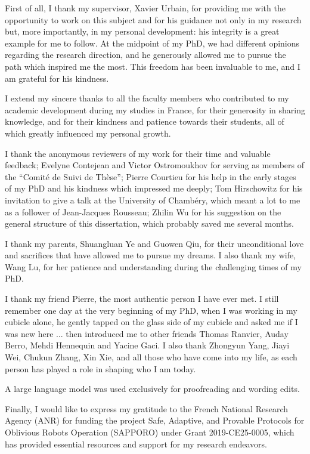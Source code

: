 

First of all, I thank my supervisor, Xavier Urbain, for providing me with the opportunity to work on this subject and for his guidance not only in my research but, more importantly, in my personal development: his integrity is a great example for me to follow. At the midpoint of my PhD, we had different opinions regarding the research direction, and he generously allowed me to pursue the path which inspired me the most. This freedom has been invaluable to me, and I am grateful for his kindness.

I extend my sincere thanks to all the faculty members who contributed to my academic development during my studies in France, for their generosity in sharing knowledge, and for their kindness and patience towards their students, all of which greatly influenced my personal growth.

I thank the anonymous reviewers of my work for their time and valuable feedback; Evelyne Contejean and Victor Ostromoukhov for serving as members of the \enquote{Comité de Suivi de Thèse}; Pierre Courtieu for his help in the early stages of my PhD and his kindness which impressed me deeply; Tom Hirschowitz for his invitation to give a talk at the University of Chambéry, which meant a lot to me as a follower of Jean-Jacques Rousseau; Zhilin Wu for his suggestion on the general structure of this dissertation, which probably saved me several months.

I thank my parents, Shuangluan Ye and Guowen Qiu, for their unconditional love and sacrifices that have allowed me to pursue my dreams. I also thank my wife, Wang Lu, for her patience and understanding during the challenging times of my PhD.

I thank my friend Pierre, the most authentic person I have ever met. I still remember one day at the very beginning of my PhD, when I was working in my cubicle alone, he gently tapped on the glass side of my cubicle and asked me if I was new here ... then introduced me to other friends Thomas Ranvier, Auday Berro, Mehdi Hennequin and Yacine Gaci. I also thank Zhongyun Yang, Jiayi Wei, Chukun Zhang, Xin Xie, and all those who have come into my life, as each person has played a role in shaping who I am today.

A large language model was used exclusively for proofreading and wording edits.

Finally, I would like to express my gratitude to the French National Research Agency (ANR) for funding the project Safe, Adaptive, and Provable Protocols for Oblivious Robots Operation (SAPPORO) under Grant 2019-CE25-0005, which has provided essential resources and support for my research endeavors.  
